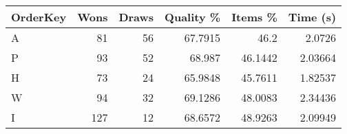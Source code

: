 \begin{tabular}{lrrrrr}
    \hline
    OrderKey & Wons & Draws & Quality \% & Items \% & Time (s) \\
    \hline
    A        & 81   & 56    & 67.7915    & 46.2     & 2.0726   \\
    P        & 93   & 52    & 68.987     & 46.1442  & 2.03664  \\
    H        & 73   & 24    & 65.9848    & 45.7611  & 1.82537  \\
    W        & 94   & 32    & 69.1286    & 48.0083  & 2.34436  \\
    I        & 127  & 12    & 68.6572    & 48.9263  & 2.09949  \\
    \hline
\end{tabular}